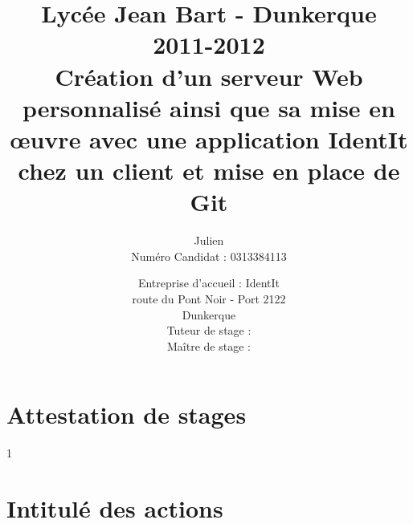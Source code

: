\documentclass[12pt,a4paper]{report}
\title
{
	\normalsize{Lycée Jean Bart - Dunkerque\\
	2011-2012}\\
	\vspace{15mm}
  \LARGE{Création d'un serveur Web personnalisé ainsi que sa mise en
    \oe{}uvre avec une application IdentIt chez un client et mise en
    place de Git
    \vspace{15mm}}
}
\author{\bsc{Stechele} Julien\\
  Numéro Candidat : 0313384113\\
	\vspace{30mm}
}
\date{
	\normalsize{Entreprise d'accueil : IdentIt\\
    route du Pont Noir - Port 2122\\
  Dunkerque\\
	\vspace{5mm}
  Tuteur de stage : \bsc{M.~Anselin}\\
	Maître de stage : \bsc{M.~Dubourg}
	}
}%
\begin{document}

\maketitle



\renewcommand{\contentsname}{Sommaire}

{\setlength{\baselineskip}{1.9\baselineskip}\tableofcontents\par}













\appendix

\chapter{Attestation de stages} %
\label{cha:Attestations de stages}
1\iere{} \ieme{} \newpage

\chapter{Intitulé des actions} %
\label{cha:Intitulé des actions}
\end{document}

